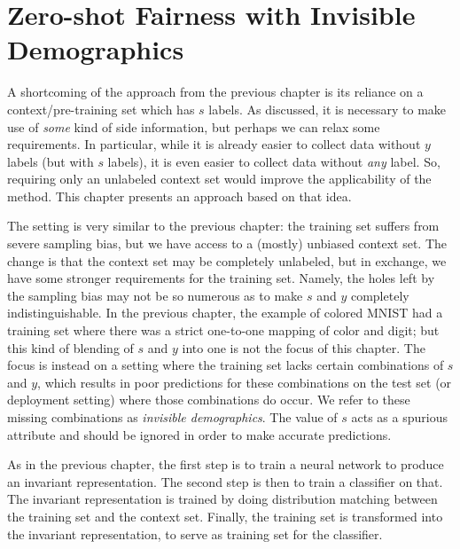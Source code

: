 \chapter{Zero-shot Fairness with Invisible Demographics}\label{ch:zsf}
A shortcoming of the approach from the previous chapter
is its reliance on a context/pre-training set which has \(s\) labels.
As discussed, it is necessary to make use of \emph{some} kind of side information,
but perhaps we can relax some requirements.
In particular, while it is already easier to collect data without \(y\) labels (but with \(s\) labels),
it is even easier to collect data without \emph{any} label.
So, requiring only an unlabeled context set would improve the applicability of the method.
This chapter presents an approach based on that idea.

The setting is very similar to the previous chapter:
the training set suffers from severe sampling bias, but we have access to a (mostly) unbiased context set.
The change is that the context set may be completely unlabeled,
but in exchange, we have some stronger requirements for the training set.
Namely, the holes left by the sampling bias may not be so numerous
as to make \(s\) and \(y\) completely indistinguishable.
In the previous chapter, the example of colored MNIST had a training set
where there was a strict one-to-one mapping of color and digit;
but this kind of blending of \(s\) and \(y\) into one is not the focus of this chapter.
The focus is instead on a setting where the training set lacks certain combinations of \(s\) and \(y\),
which results in poor predictions for these combinations on the test set (or deployment setting)
where those combinations do occur.
We refer to these missing combinations as \emph{invisible demographics}.
The value of \(s\) acts as a spurious attribute and should be ignored in order to make accurate predictions.

As in the previous chapter, the first step is to train a neural network to produce an invariant representation.
The second step is then to train a classifier on that.
The invariant representation is trained by doing distribution matching between the training set and the context set.
Finally, the training set is transformed into the invariant representation,
to serve as training set for the classifier.
